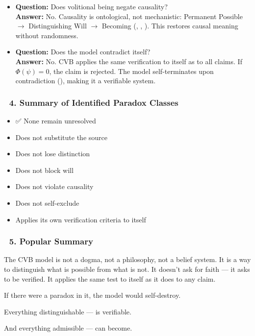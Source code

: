 \documentclass[12pt]{article}
\begin{document}
\begin{itemize}
\item \textbf{Question:} Does volitional being negate causality?  
\\ \textbf{Answer:} No. Causality is ontological, not mechanistic: Permanent Possible $\rightarrow$ Distinguishing Will $\rightarrow$ Becoming (\text{[6]}, \text{[7]}, \text{[11.1]}). This restores causal meaning without randomness.

\item \textbf{Question:} Does the model contradict itself?  
\\ \textbf{Answer:} No. CVB applies the same verification to itself as to all claims. If $\Phi(\psi) = 0$, the claim is rejected. The model self-terminates upon contradiction (\text{[11.1.1.4]}), making it a verifiable system.
\end{itemize}

\subsubsection*{🔸 4. Summary of Identified Paradox Classes}

\begin{itemize}
\item ✅ None remain unresolved
\item Does not substitute the source
\item Does not lose distinction
\item Does not block will
\item Does not violate causality
\item Does not self-exclude
\item Applies its own verification criteria to itself
\end{itemize}

\subsubsection*{🔹 5. Popular Summary}

The CVB model is not a dogma, not a philosophy, not a belief system. It is a way to distinguish what is possible from what is not. It doesn’t ask for faith — it asks to be verified. It applies the same test to itself as it does to any claim.

If there were a paradox in it, the model would self-destroy.

Everything distinguishable — is verifiable.

And everything admissible — can become.
\end{document}
